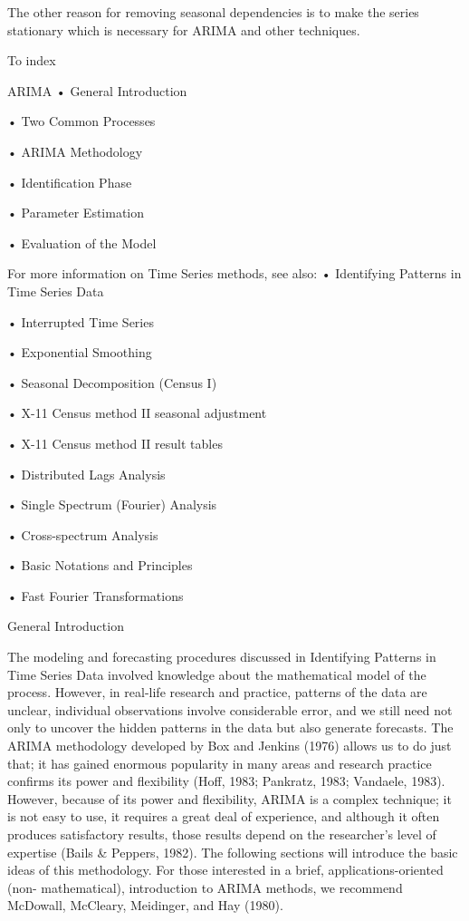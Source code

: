 The other reason for removing seasonal dependencies is to make the series stationary which is necessary for ARIMA and other techniques.







To index
 


ARIMA
•
General Introduction

•
Two Common Processes

•
ARIMA Methodology

•
Identification Phase

•
Parameter Estimation

•
Evaluation of the Model


For more information on Time Series methods, see also:
•
Identifying Patterns in Time Series Data

•
Interrupted Time Series

•
Exponential Smoothing

•
Seasonal Decomposition (Census I)

•
X-11 Census method II seasonal adjustment

•
X-11 Census method II result tables

•
Distributed Lags Analysis

•
Single Spectrum (Fourier) Analysis

•
Cross-spectrum Analysis

•
Basic Notations and Principles

•
Fast Fourier Transformations


General Introduction

The modeling and forecasting procedures discussed in Identifying Patterns in Time Series Data involved knowledge about the mathematical model of the process. However, in real-life research and practice, patterns of the data are unclear, individual observations involve considerable error, and we still need not only to uncover the hidden patterns in the data but also generate forecasts. The ARIMA methodology developed by Box and Jenkins (1976) allows us to do just that; it has gained enormous popularity in many areas and research practice confirms its power and flexibility (Hoff, 1983; Pankratz, 1983; Vandaele, 1983). However, because of its power and flexibility, ARIMA is a complex technique; it is not easy to use, it requires a great deal of experience, and although it often produces satisfactory results, those results depend on the researcher's level of expertise (Bails & Peppers, 1982). The following sections will introduce the basic ideas of this methodology. For those interested in a brief, applications-oriented (non- mathematical), introduction to ARIMA methods, we recommend McDowall, McCleary, Meidinger, and Hay (1980).

